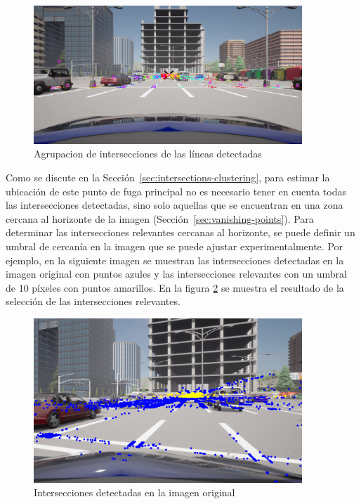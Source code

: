 \begin{figure}[!ht]
    \centering
    \includegraphics[width=0.9\textwidth]{img/reticule/svd-km}
    \caption{Agrupacion de intersecciones de las líneas detectadas}
    \label{fig:intersections}
\end{figure}
\noindent
Como se discute en la Sección~\ref{sec:intersections-clustering}, para estimar la ubicación de este punto de fuga principal no es necesario tener en cuenta todas las intersecciones detectadas, sino solo aquellas que se encuentran en una zona cercana al horizonte de la imagen (Sección~\ref{sec:vanishing-points}).
Para determinar las intersecciones relevantes cercanas al horizonte, se puede definir un umbral de cercanía en la imagen que se puede ajustar experimentalmente.
Por ejemplo, en la siguiente imagen se muestran las intersecciones detectadas en la imagen original con puntos azules
y las intersecciones relevantes con un umbral de 10 píxeles con puntos amarillos.
En la figura \ref{fig:relevantInter} se muestra el resultado de la selección de las intersecciones relevantes. \\
\begin{figure}[!ht]
    \centering
    \includegraphics[width=0.9\textwidth]{img/reticule/relevantInter}
    \caption{Intersecciones detectadas en la imagen original}
    \label{fig:relevantInter}
\end{figure}


